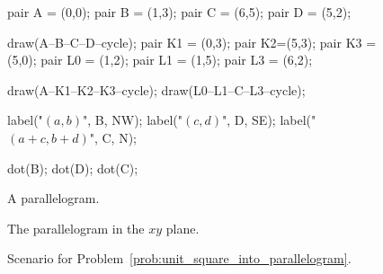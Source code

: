 \documentclass[../textbook.tex]{subfiles}
\begin{document}
\begin{figure}[h]
\begin{center}
\begin{minipage}[b]{0.3\textwidth}
\begin{asy}[width=\textwidth]
				pair A = (0,0);
				pair B = (1,3);
				pair C = (6,5);
				pair D = (5,2);

				draw(A--B--C--D--cycle);
				pair K1 = (0,3);
				pair K2=(5,3);
				pair K3 = (5,0);
				pair L0 = (1,2);
				pair L1 = (1,5);
				pair L3 = (6,2);

				draw(A--K1--K2--K3--cycle);
				draw(L0--L1--C--L3--cycle);

				label("$(a,b)$", B, NW);
				label("$(c,d)$", D, SE);
				label("$(a+c,b+d)$", C, N);

				dot(B);
				dot(D);
				dot(C);

			\end{asy}
		\end{minipage}
	\end{center}
	\vspace*{-2\baselineskip}
	\begin{center}
		\begin{minipage}[t]{0.3\textwidth}
			\caption{A parallelogram.}
			\label{fig:parallelogram_generic}
		\end{minipage}
		\hfill
		\begin{minipage}[t]{0.3\textwidth}
			\caption{The parallelogram in the $xy$ plane.}
			\label{fig:para_in_xy}
		\end{minipage}
		\hfill
		\begin{minipage}[t]{0.3\textwidth}
			\caption{Scenario for Problem~\ref{prob:unit_square_into_parallelogram}.}
			\label{fig:para_scenario}
		\end{minipage}
	\end{center}
	\vspace*{-2\baselineskip}
\end{figure}
\end{document}
